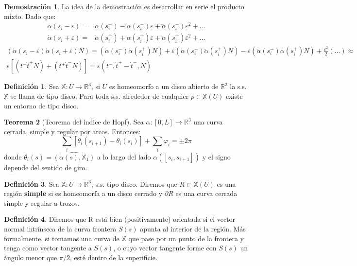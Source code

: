 \documentclass[twoside]{report}
\theoremstyle{definition}
\newtheorem{theorem}{Teorema}[section]
\newtheorem{defi}[theorem]{Definición}
\newtheorem*{dem}{Demostración}
\numberwithin{equation}{section}
\newcommand{\R}{\mathbb{R}}
\newcommand{\X}{\mathbb{X}}
\newcommand{\seaX}{\X:U\rightarrow\R^3}
\begin{document}
\begin{dem}
La idea de la demostración es desarrollar en serie el producto mixto. Dado que:
\begin{align*}
\dot{\alpha}(s_i-\varepsilon) = & \dot{\alpha}(s_i^-) - \ddot{\alpha}(s_i^-)\varepsilon + \dddot{\alpha}(s_i^-)\varepsilon^2 + \dotsc\\
\dot{\alpha}(s_i+\varepsilon) = & \dot{\alpha}(s_i^+) + \ddot{\alpha}(s_i^+)\varepsilon + \dddot{\alpha}(s_i^+)\varepsilon^2 + \dotsc
\end{align*}
\begin{gather*}
(\dot{\alpha}(s_i -\varepsilon) \dot{\alpha}(s_i+\varepsilon) N) = (\dot{\alpha}(s_i^-) \dot{\alpha}(s_i^+)  N) + \varepsilon (\dot{\alpha}(s_i^-) \ddot{\alpha}(s_i^+)  N) - \varepsilon(\ddot{\alpha}(s_i^-) \dot{\alpha}(s_i^+)  N) + \frac{\varepsilon^2}{2}(\dotsc) \approx\\
\varepsilon[(t^- \dot{t}^+N) + (t^+\dot{t}^-N)] = \varepsilon(t^-,\dot{t}^+ - \dot{t}^- , N)
\end{gather*}
\end{dem}
\begin{defi}
Sea $\X:U\rightarrow\R^3$, si $U$ es homeomorfo a un disco abierto de $\R^2$ la s.s. $\X$ se llama de tipo disco. Para toda s.s. alrededor de cualquier $p\in\X(U)$ existe un entorno de tipo disco.
\end{defi}
\begin{theorem}[Teorema del índice de Hopf] Sea $\alpha:[0,L]\rightarrow\R^3$ una curva cerrada, simple y regular por arcos. Entonces:
\[
\sum_i [\theta_i(s_{i+1})-\theta_i(s_i)] + \sum_i \varphi_i = \pm 2\pi
\]
donde $\theta_i(s) =\widehat{(\dot{\alpha}(s),\mathbb{X}_1)}$ a lo largo del lado $\alpha([s_i,s_{i+1}])$ y el signo depende del sentido de giro. 
\end{theorem}
\begin{defi}
Sea $\seaX$, s.s. tipo disco. Diremos que $R \subset \X(U)$ es una región \textbf{simple} si es homeomorfa a un disco cerrado y $\partial R$ es una curva cerrada simple y regular a trozos.
\end{defi}
\begin{defi}
Diremos que R está bien (positivamente) orientada si el vector normal intrínseca de la curva frontera $S(s)$ apunta al interior de la región. Más formalmente, si tomamos una curva de $\X$ que pase por un punto de la frontera y tenga como vector tangente a $S(s)$, o cuyo vector tangente forme con $S(s)$ un ángulo menor que $\pi/2$, esté dentro de la superificie.
\end{defi}
\end{document}
